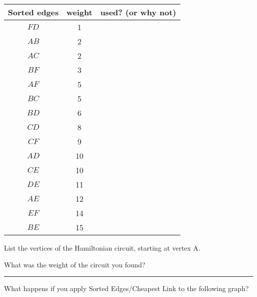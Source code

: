 \documentclass[12pt]{article}
\newcommand{\ans}[1][1in]{\rule{#1}{.5pt}}
\begin{document}
\begin{adjustbox}{valign=t,minipage={.1\linewidth}}
\begin{tabular}{ c | c | c }
Sorted edges & weight & used? (or why not) \\ \hline
$FD$ & 1 & \\ \hline
$AB$ & 2  &\\ \hline
$AC$ & 2 & \\ \hline
$BF$ & 3 &\\ \hline 
$AF$ & 5& \\ \hline
$BC$ & 5 & \\ \hline
$BD$ & 6& \\ \hline
$CD$ & 8& \\  \hline
$CF$ & 9&\\ \hline
$AD$ & 10&\\ \hline
$CE$ & 10 &\\ \hline
$DE$ & 11&\\ \hline
$AE$ & 12& \\ \hline
$EF$ & 14& \\ \hline
$BE$ & 15&\\ \hline
 \end{tabular}
 \end{adjustbox}

List the vertices of the Hamiltonian circuit, starting at vertex A. 

\hrulefill

What was the weight of the circuit you found? \ans




\newpage

What happens if you apply Sorted Edges/Cheapest Link to the following graph?
\end{document}
